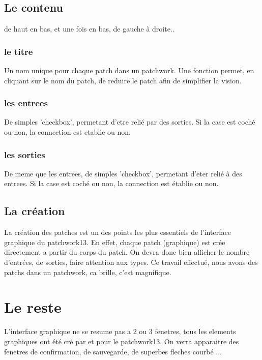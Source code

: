 \subsection{Le contenu}
de haut en bas, et une fois en bas, de gauche \`a droite..
\subsubsection{le titre}
Un nom unique pour chaque patch dans un patchwork. Une fonction permet, en cliquant 
sur le nom du patch, de reduire le patch afin de simplifier la vision.
\subsubsection{les entrees}
De simples 'checkbox', permetant d'etre reli\'e par des sorties. Si la case est 
coch\'e ou non, la connection est etablie ou non. 
\subsubsection{les sorties}
De meme que les entrees, de simples 'checkbox', permetant d'eter reli\'e \`a des 
entrees. Si la case est coch\'e ou non, la connection est \'etablie ou non. 
\subsection{La cr\'eation}
La cr\'eation des patches est un des points les plus essentiels de l'interface 
graphique du patchwork13. En effet, chaque patch (graphique) est cr\'ee directement 
a partir du corps du patch. On devra donc bien afficher le nombre d'entr\'ees, 
de sorties, faire attention aux types. Ce travail effectu\'e, nous avons des 
patchs dans un patchwork, ca brille, c'est magnifique.
\section{Le reste}
L'interface graphique ne se resume pas a 2 ou 3 fenetres, tous les elements
graphiques ont \'et\'e cr\'e par et pour le patchwork13. On verra apparaitre des 
fenetres de confirmation, de sauvegarde, de superbes fleches courb\'e ...